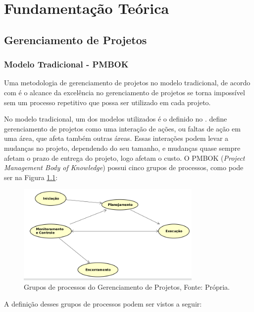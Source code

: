 \chapter[Fundamentação Teórica]{Fundamentação Teórica}
\label{cp:fundamentacao}

\section{Gerenciamento de Projetos}
\label{sec:gerenciamento_de_projetos}

\subsection{Modelo Tradicional - PMBOK}
\label{sec:modelo_tradicional}

Uma metodologia de gerenciamento de projetos no modelo tradicional, de acordo com \cite{kerzner} é o alcance da excelência no gerenciamento de projetos se torna impossível sem um processo repetitivo que possa ser utilizado em cada projeto.

No modelo tradicional, um dos modelos utilizados é o definido no \cite{pmbok}. \cite{gerenciamento_de_projetos_pmbok} define gerenciamento de projetos como uma interação de ações, ou faltas de ação em uma área, que afeta também outras áreas. Essas interações podem levar a mudanças no projeto, dependendo do seu tamanho, e mudanças quase sempre afetam o prazo de entrega do projeto, logo afetam o custo. O PMBOK (\textit{Project Management Body of Knowledge}) possui cinco grupos de processos, como pode ser na Figura \ref{img:fases_pmbok}:

\begin{figure}[H]
	\centering
	\includegraphics[width=0.8\textwidth]{figuras/fases_pmbok.png}
	\caption{Grupos de processos do Gerenciamento de Projetos, Fonte: Própria.}
	\label{img:fases_pmbok}
\end{figure}

A definição desses grupos de processos podem ser vistos a seguir:

